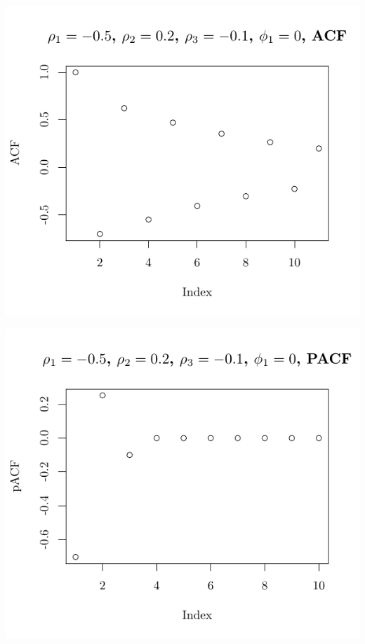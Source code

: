 \documentclass[10pt]{paper}\usepackage[]{graphicx}\usepackage[]{color}
\makeatletter
\def\maxwidth{ %
  \ifdim\Gin@nat@width>\linewidth
    \linewidth
  \else
    \Gin@nat@width
  \fi
}
\newenvironment{knitrout}{}{} %
\makeatother
\begin{document}
\begin{knitrout}
{\centering \includegraphics[width=\maxwidth]{figure/graphics-plotter-101} 

}




{\centering \includegraphics[width=\maxwidth]{figure/graphics-plotter-102} 

}





\end{knitrout}
\end{document}
